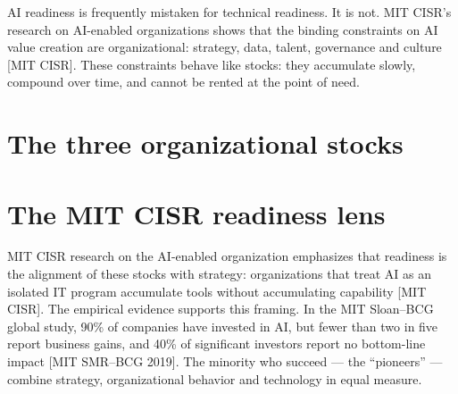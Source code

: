 
AI readiness is frequently mistaken for technical readiness. It is not. MIT
CISR's research on AI-enabled organizations shows that the binding constraints
on AI value creation are organizational: strategy, data, talent, governance
and culture [MIT CISR]. These constraints behave like stocks: they accumulate
slowly, compound over time, and cannot be rented at the point of need.

\section{The three organizational stocks}

\vspace{-0.3em}
\par\vspace{0.7em}

\par\vspace{0.7em}

\par

\section{The MIT CISR readiness lens}

MIT CISR research on the AI-enabled organization emphasizes that readiness is
the alignment of these stocks with strategy: organizations that treat AI as an
isolated IT program accumulate tools without accumulating capability
[MIT CISR]. The empirical evidence supports this framing. In the MIT Sloan--BCG
global study, 90\% of companies have invested in AI, but fewer than two in five
report business gains, and 40\% of significant investors report no bottom-line
impact [MIT SMR--BCG 2019]. The minority who succeed — the ``pioneers'' —
combine strategy, organizational behavior and technology in equal measure.

